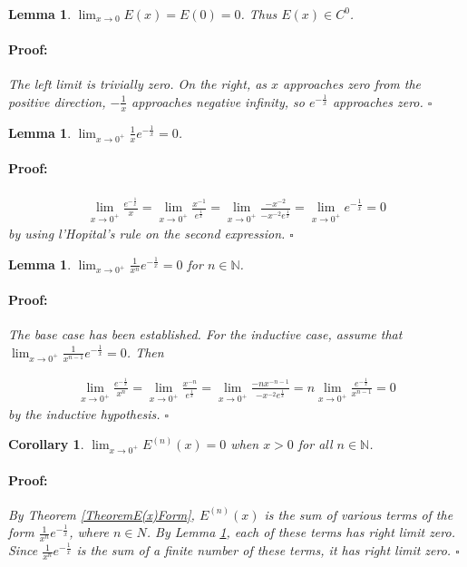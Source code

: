\documentclass{article}
\newenvironment{proof}{\paragraph{Proof:}}{\hfill$\square$}
\newtheorem{lemma}[theorem]{Lemma}
\newtheorem{corollary}[theorem]{Corollary}
\newcommand{\N}{\mathbb{N}}
\begin{document}
\begin{lemma}
$\lim_{x \rightarrow 0} E(x) = E(0) = 0$. Thus $E(x) \in C^0$.
\begin{proof}
The left limit is trivially zero. On the right, as $x$ approaches zero from the positive direction, $-\frac{1}{x}$ approaches negative infinity, so $e^{-\frac{1}{x}}$ approaches zero. 
\end{proof}
\end{lemma}

\begin{lemma}
$\lim_{x \rightarrow 0^+} \frac{1}{x}e^{-\frac{1}{x}} = 0$.
\begin{proof}
\begin{align*}
\lim_{x \rightarrow 0^+} \frac{e^{-\frac{1}{x}}}{x}
= \lim_{x \rightarrow 0^+} \frac{x^{-1}}{e^{\frac{1}{x}}}
= \lim_{x \rightarrow 0^+} \frac{-x^{-2}}{-x^{-2}e^{\frac{1}{x}}}
= \lim_{x \rightarrow 0^+} e^{-\frac{1}{x}} = 0
\end{align*}
by using l'Hopital's rule on the second expression.
\end{proof}
\end{lemma}

\begin{lemma}
\label{LemmaEn(x)PartsHaveRightLimitZero}
$\lim_{x \rightarrow 0^+} \frac{1}{x^n}e^{-\frac{1}{x}} = 0$ for $n \in \N$.
\begin{proof}
The base case has been established. For the inductive case, assume that $\lim_{x \rightarrow 0^+} \frac{1}{x^{n-1}}e^{-\frac{1}{x}} = 0$. Then

\begin{align*}
\lim_{x \rightarrow 0^+} \frac{e^{-\frac{1}{x}}}{x^n}
= \lim_{x \rightarrow 0^+} \frac{x^{-n}}{e^{\frac{1}{x}}}
= \lim_{x \rightarrow 0^+} \frac{-nx^{-n-1}}{-x^{-2}e^{\frac{1}{x}}}
= n\lim_{x \rightarrow 0^+} \frac{e^{-\frac{1}{x}}}{x^{n-1}} = 0
\end{align*}
by the inductive hypothesis.
\end{proof}
\end{lemma}

\begin{corollary}
\label{CorollaryEn(x)HasRightLimitZero}
$\lim_{x \rightarrow 0^+}E^{(n)}(x) = 0$ when $x > 0$ for all $n \in \N$.
\begin{proof}
By Theorem \ref{TheoremE(x)Form}, $E^{(n)}(x)$ is the sum of various terms of the form $\frac{1}{x^n}e^{-\frac{1}{x}}$, where $n \in N$. By Lemma \ref{LemmaEn(x)PartsHaveRightLimitZero}, each of these terms has right limit zero. Since $\frac{1}{x^n}e^{-\frac{1}{x}}$ is the sum of a finite number of these terms, it has right limit zero.
\end{proof}
\end{corollary}
\end{document}
